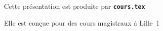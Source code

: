   \item Cette présentation est produite par \texttt{\textbf{cours.tex}}
  \item Elle est conçue pour des cours magistraux à Lille~1
